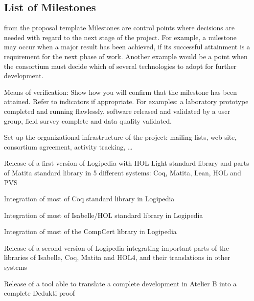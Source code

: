\subsection{List of Milestones}\label{sec:milestones}

\begin{todo}{from the proposal template}
  Milestones are control points where decisions are needed with regard to the next stage
  of the project. For example, a milestone may occur when a major result has been
  achieved, if its successful attainment is a requirement for the next phase of
  work. Another example would be a point when the consortium must decide which of several
  technologies to adopt for further development.

  Means of verification: Show how you will confirm that the milestone has been
  attained. Refer to indicators if appropriate. For examples: a laboratory prototype
  completed and running flawlessly, software released and validated by a user group, field
  survey complete and data quality validated.
\end{todo}



\begin{milestones}
    {Set up the organizational infrastructure of the project: mailing lists, web site, consortium agreement, activity tracking, \ldots}

     {Release of a first version of Logipedia with HOL Light standard library and parts of Matita standard library in 5 different systems: Coq, Matita, Lean, HOL and PVS}

     {Integration of most of Coq standard library in Logipedia}

     {Integration of most of Isabelle/HOL standard library in Logipedia}

     {Integration of most of the CompCert library in Logipedia}

     {Release of a second version of Logipedia integrating important parts of the libraries of Isabelle, Coq, Matita and HOL4, and their translations in other systems}

     {Release of a tool able to translate a complete development in Atelier B into a complete Dedukti proof}

\end{milestones}


